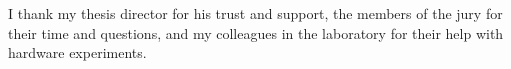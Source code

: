 I thank my thesis director for his trust and support, the members of the jury for their time
and questions, and my colleagues in the laboratory for their help with hardware experiments.
